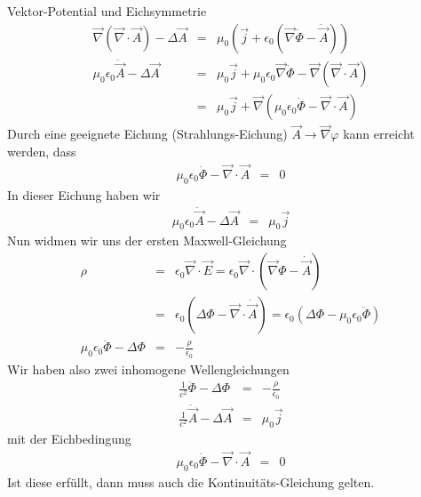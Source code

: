 \begin{chapter}{\titlestr}
\begin{section}{Vektor-Potential und Eichsymmetrie}
\begin{eqnarray*}
\vec{\nabla}\left(\vec{\nabla}\cdot\vec{A}\right)-\Delta \vec{A}  &=& \mu_0\left(\vec{j}+\epsilon_0\left(\vec{\nabla}\dot{\Phi}-\ddot{\vec{A}}\right)\right)\\
\mu_0\epsilon_0\ddot{\vec{A}}-\Delta \vec{A}  &=& \mu_0\vec{j}+\mu_0\epsilon_0\vec{\nabla}\dot{\Phi}-\vec{\nabla}\left(\vec{\nabla}\cdot\vec{A}\right)\\
&=&\mu_0\vec{j}+\vec{\nabla}\left(\mu_0\epsilon_0\dot{\Phi}-\vec{\nabla}\cdot\vec{A}\right)
\end{eqnarray*}
Durch eine geeignete Eichung (Strahlungs-Eichung) $\vec{A}\rightarrow \vec{\nabla}\varphi$ kann erreicht werden,
dass
\begin{eqnarray}
\label{radiation_gauge}
\mu_0\epsilon_0\dot{\Phi}-\vec{\nabla}\cdot\vec{A} &=& 0
\end{eqnarray}
In dieser Eichung haben wir
\begin{eqnarray*}
\mu_0\epsilon_0\ddot{\vec{A}}-\Delta \vec{A}  &=&\mu_0\vec{j}
\end{eqnarray*}
Nun widmen wir uns der ersten Maxwell-Gleichung
\begin{eqnarray*}
\rho &=& \epsilon_0 \vec{\nabla}\cdot\vec{E}=\epsilon_0 \vec{\nabla}\cdot\left(\vec{\nabla}\Phi-\dot{\vec{A}}\right)\\
&=& \epsilon_0 \left(\Delta\Phi-\vec{\nabla}\cdot\dot{\vec{A}}\right)=\epsilon_0 \left(\Delta\Phi-\mu_0\epsilon_0\ddot{\Phi}\right)\\
\mu_0\epsilon_0\ddot{\Phi}-\Delta\Phi &=& -\frac{\rho}{\epsilon_0}
\end{eqnarray*}
Wir haben also zwei inhomogene Wellengleichungen
\begin{eqnarray*}
\frac{1}{c^2}\ddot{\Phi}-\Delta\Phi &=& -\frac{\rho}{\epsilon_0}\\
\frac{1}{c^2}\ddot{\vec{A}}-\Delta \vec{A}  &=&\mu_0\vec{j}
\end{eqnarray*}
mit der Eichbedingung
\begin{eqnarray*}
\mu_0\epsilon_0\dot{\Phi}-\vec{\nabla}\cdot\vec{A} &=& 0
\end{eqnarray*}
Ist diese erfüllt, dann muss auch die Kontinuitäts-Gleichung gelten.
\end{section}


\end{chapter}
